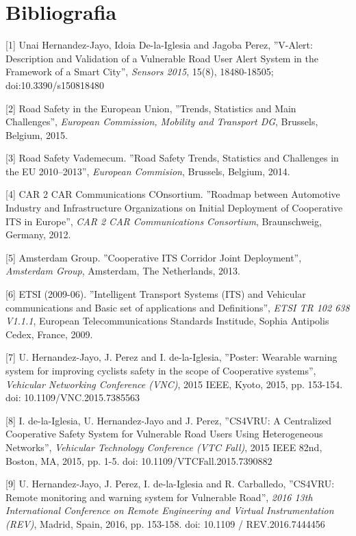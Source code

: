 \chapter{Bibliografia}
[1] Unai Hernandez-Jayo, Idoia De-la-Iglesia and Jagoba Perez, ''V-Alert: Description and Validation of a Vulnerable Road User Alert System in the Framework of a Smart City'', \emph{Sensors 2015}, 15(8), 18480-18505; doi:10.3390/s150818480

[2] Road Safety in the European Union, ''Trends, Statistics and Main Challenges'', \emph{European Commission, Mobility and Transport DG}, Brussels, Belgium, 2015.

[3] Road Safety Vademecum. ''Road Safety Trends, Statistics and Challenges in the EU 2010–2013'', \emph{European Commision}, Brussels, Belgium, 2014.

[4] CAR 2 CAR Communications COnsortium. ''Roadmap between Automotive Industry and Infrastructure Organizations on Initial Deployment of Cooperative ITS in Europe'', \emph{CAR 2 CAR Communications Consortium}, Braunschweig, Germany, 2012.

[5] Amsterdam Group. ''Cooperative ITS Corridor Joint Deployment'', \emph{Amsterdam Group}, Amsterdam, The Netherlands, 2013.

[6] ETSI (2009-06). ''Intelligent Transport Systems (ITS) and Vehicular communications and Basic set of applications and Definitions'', \emph{ETSI TR 102 638 V1.1.1}, European Telecommunications Standards Institude, Sophia Antipolis Cedex, France, 2009.

[7] U. Hernandez-Jayo, J. Perez and I. de-la-Iglesia, ''Poster: Wearable warning system for improving cyclists safety in the scope of Cooperative systems'', \emph{Vehicular Networking Conference (VNC)}, 2015 IEEE, Kyoto, 2015, pp. 153-154.
doi: 10.1109/VNC.2015.7385563

[8] I. de-la-Iglesia, U. Hernandez-Jayo and J. Perez, ''CS4VRU: A Centralized Cooperative Safety System for Vulnerable Road Users Using Heterogeneous Networks'', \emph{Vehicular Technology Conference (VTC Fall)}, 2015 IEEE 82nd, Boston, MA, 2015, pp. 1-5. doi: 10.1109/VTCFall.2015.7390882

[9] U. Hernandez-Jayo, J. Perez, I. de-la-Iglesia and R. Carballedo, ''CS4VRU: Remote monitoring and warning system for Vulnerable Road'', \emph{2016 13th International Conference on Remote Engineering and Virtual Instrumentation (REV)}, Madrid, Spain, 2016, pp. 153-158. doi: 10.1109 / REV.2016.7444456